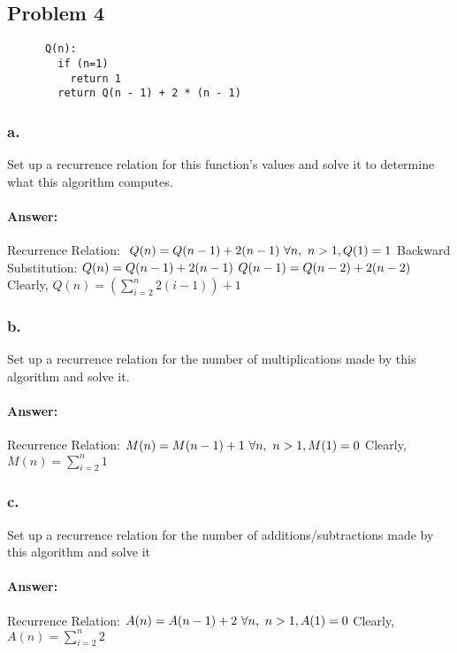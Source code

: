 \documentclass{article}
\begin{document}
  \subsection{Problem 4}
    \begin{lstlisting}
      Q(n):
        if (n=1)
          return 1
        return Q(n - 1) + 2 * (n - 1)
      \end{lstlisting}
    \subsubsection{a. }
    Set up a recurrence relation for this function’s values and solve it to determine what this algorithm computes.
    \paragraph{Answer: \newline}
      Recurrence Relation: $\ Q(n) = Q(n-1) + 2(n-1) \ \forall{n}, \ n > 1, Q(1) = 1 \\ \\$
      Backward Substitution: \newline
      \hspace*{1cm}$Q(n) = Q(n-1) + 2(n-1)\\$
       \hspace*{1cm}$Q(n-1) = Q(n-2) + 2(n-2) \\$
      Clearly, $Q(n) = (\sum\limits_{i=2}^{n}2(i-1)) + 1$
    \subsubsection{b.}
    Set up a recurrence relation for the number of multiplications made by this
      algorithm and solve it.
    \paragraph{Answer: \newline}
    Recurrence Relation: $M(n) = M(n-1) + 1 \ \forall{n}, \ n > 1, M(1) = 0  \\$
    Clearly, $M(n) = \sum\limits_{i=2}^{n}1$
  \subsubsection{c. }
  Set up a recurrence relation for the number of additions/subtractions made
  by this algorithm and solve it
  \paragraph{Answer: \newline}
    Recurrence Relation: $A(n) = A(n-1) + 2 \ \forall{n}, \ n>1, A(1) = 0\\$
    Clearly, $A(n) = \sum\limits_{i=2}^{n}2$
\end{document}
